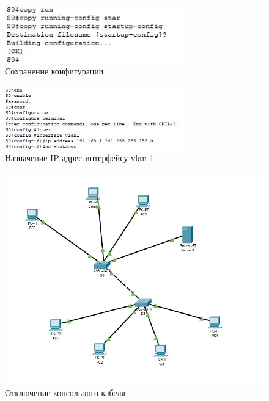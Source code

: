 \documentclass[bachelor, och, labwork]{shiza}
\begin{document}
\begin{enumerate}
    \begin{figure}[H]
        \centering      %
        \includegraphics[width=0.7\textwidth]{6}
        \caption{Сохранение конфигурации}
        \label{fig:image1}
    \end{figure}

    \begin{figure}[H]
        \centering      %
        \includegraphics[width=0.7\textwidth]{7}
        \caption{Назначение IP адрес интерфейсу vlan 1}
        \label{fig:image1}
    \end{figure}

    \begin{figure}[H]
        \centering      %
        \includegraphics[width=1\textwidth]{8}
        \caption{Отключение консольного кабеля}
        \label{fig:image1}
    \end{figure}


\end{enumerate}
\end{document}
